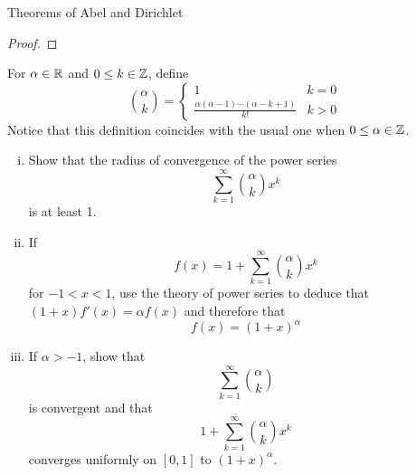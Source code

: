 \begin{section}{Theorems of Abel and Dirichlet}
\begin{cor}
\end{cor}

\begin{proof}
\end{proof}


\begin{ex}
	For $\isreal[\alpha]$ and $0 \leq k \in \intgr$, define
		\begin{displaymath}
			{\alpha \choose k} =
				\begin{cases}
					1 & k = 0 \\
					\displaystyle{
						\frac{\alpha(\alpha-1)\cdots(\alpha-k+1)}
						{k!}} & k > 0
				\end{cases}
		\end{displaymath}
	Notice that this definition coincides with the usual one
	when $0 \leq \isintgr[\alpha]$.
	
	\begin{enumerate}[i)]
	
		\item
			Show that the radius of convergence of the power
			series
				\begin{displaymath}
					\sum_{k=1}^\infty {\alpha \choose k} x^k
				\end{displaymath}
			is at least 1.
			
		\item
			If
				\begin{displaymath}
					f(x) = 1 + \sum_{k=1}^\infty 
						{\alpha \choose k} x^k
				\end{displaymath}
			for $-1 < x < 1$, use the theory of power series to
			deduce that $(1+x)f'(x) = \alpha f(x)$ and therefore
			that
				\begin{displaymath}
					f(x) = (1+x)^\alpha
				\end{displaymath}
				
		\item
			If $\alpha > -1$, show that
				\begin{displaymath}
					\sum_{k=1}^\infty {\alpha \choose k}
				\end{displaymath}
			is convergent and that
				\begin{displaymath}
					1 + \sum_{k=1}^\infty {\alpha \choose k} x^k
				\end{displaymath}
			converges uniformly on $[0,1]$ to $(1+x)^\alpha$.
			

\end{enumerate}
\end{ex}
\end{section}
